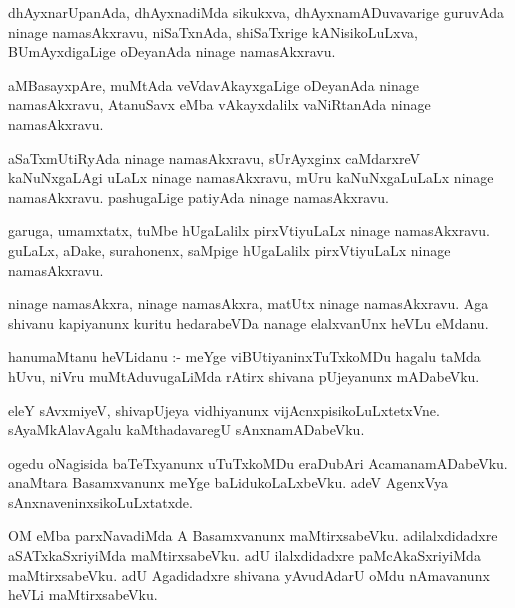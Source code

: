 \documentclass{article}
\begin{document}
\begin{mn}
dhAyxnarUpanAda,  dhAyxnadiMda  sikukxva,  dhAyxnamADuvavarige  guruvAda  ninage  namasAkxravu,  niSaTxnAda,  
shiSaTxrige  kANisikoLuLxva,  BUmAyxdigaLige  oDeyanAda  ninage  namasAkxravu.
\end{mn}

\begin{mn}
aMBasayxpAre,  muMtAda  veVdavAkayxgaLige  oDeyanAda  ninage  namasAkxravu,  AtanuSavx  eMba  vAkayxdalilx  
vaNiRtanAda  ninage  namasAkxravu.
\end{mn}

\begin{mn}
aSaTxmUtiRyAda  ninage  namasAkxravu,  sUrAyxginx caMdarxreV  kaNuNxgaLAgi  uLaLx  ninage  namasAkxravu,  
mUru  kaNuNxgaLuLaLx  ninage  namasAkxravu.  pashugaLige  patiyAda  ninage  namasAkxravu.
\end{mn}

\begin{mn}
garuga,  umamxtatx,  tuMbe  hUgaLalilx  pirxVtiyuLaLx  ninage  namasAkxravu.  guLaLx,  aDake,  surahonenx,  
saMpige  hUgaLalilx  pirxVtiyuLaLx  ninage  namasAkxravu.
\end{mn}

\begin{mn}
ninage  namasAkxra,  ninage  namasAkxra,  matUtx  ninage  namasAkxravu.  Aga  shivanu  kapiyanunx  
kuritu  hedarabeVDa  nanage  elalxvanUnx  heVLu  eMdanu.  
\end{mn}

\begin{mn}
hanumaMtanu  heVLidanu :- meYge  viBUtiyaninxTuTxkoMDu  hagalu  taMda  hUvu,  niVru  muMtAduvugaLiMda  
rAtirx  shivana  pUjeyanunx  mADabeVku.
\end{mn}

\begin{mn}
eleY  sAvxmiyeV,  shivapUjeya  vidhiyanunx  vijAcnxpisikoLuLxtetxVne.  sAyaMkAlavAgalu  kaMthadavaregU  sAnxnamADabeVku.
\end{mn}

\begin{mn}
ogedu  oNagisida  baTeTxyanunx  uTuTxkoMDu  eraDubAri  AcamanamADabeVku.  anaMtara  Basamxvanunx  meYge  
baLidukoLaLxbeVku.  adeV  AgenxVya  sAnxnaveninxsikoLuLxtatxde.
\end{mn}

\begin{mn}
OM  eMba  parxNavadiMda  A  Basamxvanunx  maMtirxsabeVku.  adilalxdidadxre  aSATxkaSxriyiMda  maMtirxsabeVku.  adU  
ilalxdidadxre  paMcAkaSxriyiMda  maMtirxsabeVku.  adU  Agadidadxre  shivana  yAvudAdarU  oMdu  nAmavanunx  heVLi  maMtirxsabeVku.
\end{mn}
\end{document}
